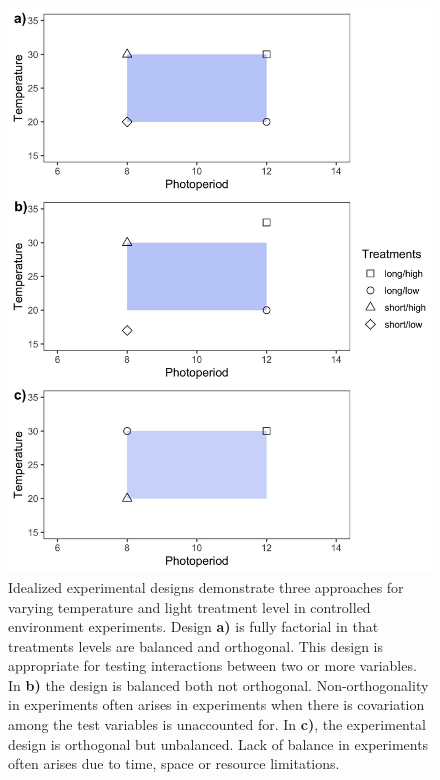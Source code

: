 \documentclass[11pt]{article}
\begin{document}
{

\begin{figure}[h!]
    \centering
 \includegraphics[width=.8\textwidth]{..//Plots/periodicity_figures/factorial.jpeg}
    \caption{Idealized experimental designs demonstrate three approaches for varying temperature and light treatment level in controlled environment experiments. Design \textbf{a)} is fully factorial in that treatments levels are balanced and orthogonal. This design is appropriate for testing interactions between two or more variables. In \textbf{b)} the design is balanced both not orthogonal. Non-orthogonality in experiments often arises in experiments when there is covariation among the test variables is unaccounted for. In \textbf{c)}, the experimental design is orthogonal but unbalanced. Lack of balance in experiments often arises due to time, space or resource limitations. }
    \label{fig:examp}
\end{figure}

}
\end{document}
